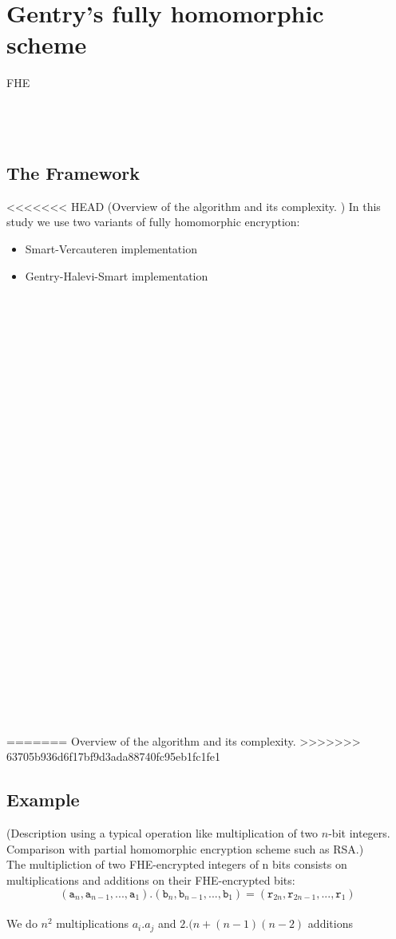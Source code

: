\documentclass{acm_proc_article-sp}
\begin{document}
\section{Gentry's fully homomorphic scheme}
 FHE\\\\\\\
\subsection{The Framework}
<<<<<<< HEAD
(Overview of the algorithm and its complexity. )
In this study we use two variants of fully homomorphic encryption: 
\begin{itemize}
\item Smart-Vercauteren implementation


\item Gentry-Halevi-Smart implementation

\end{itemize}

 \\\\\\\\\\\\\\\\\\\\\\\\\\\\\\\\\\\\\\\\\\\\\\\\\\\\\\\\
=======
Overview of the algorithm and its complexity. 
>>>>>>> 63705b936d6f17bf9d3ada88740fc95eb1fc1fe1

\subsection{Example}
(Description using a typical operation like multiplication of two $n$-bit integers. Comparison with partial homomorphic encryption scheme such as RSA.)\\
The multipliction of two FHE-encrypted integers of n bits consists on multiplications and additions on their FHE-encrypted bits: \[(\texttt{a}_{n},\texttt{a}_{n-1}, ... ,\texttt{a}_{1}) . (\texttt{b}_{n},\texttt{b}_{n-1}, ... ,\texttt{b}_{1}) = (\texttt{r}_{2n},\texttt{r}_{2n-1}, ... ,\texttt{r}_{1})\] \\
We do $ n^{2}$ multiplications $ a_i.a_j$ and $ 2.(n + (n-1)(n-2)$ additions
\end{document}
